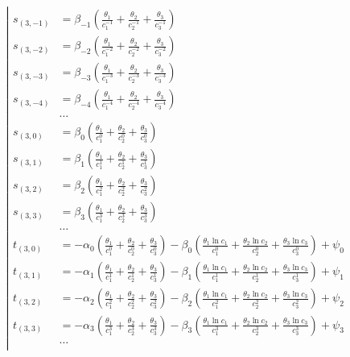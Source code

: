 \begin{equation*} \left| \begin{aligned}
%
s_{(3,-1)} &=
  \beta_{-1} \left(
  \frac{\theta_1}{c_1^{-1}}
+ \frac{\theta_2}{c_2^{-1}}
+ \frac{\theta_3}{c_3^{-1}} \right) \\
%
s_{(3,-2)} &=
  \beta_{-2} \left(
  \frac{\theta_1}{c_1^{-2}}
+ \frac{\theta_2}{c_2^{-2}}
+ \frac{\theta_3}{c_3^{-2}} \right) \\
%
s_{(3,-3)} &=
  \beta_{-3} \left(
  \frac{\theta_1}{c_1^{-3}}
+ \frac{\theta_2}{c_2^{-3}}
+ \frac{\theta_3}{c_3^{-3}} \right) \\
%
s_{(3,-4)} &=
  \beta_{-4} \left(
  \frac{\theta_1}{c_1^{-4}}
+ \frac{\theta_2}{c_2^{-4}}
+ \frac{\theta_3}{c_3^{-4}} \right) \\
%
&\ldots \\
%
s_{(3,0)} &=
  \beta_0 \left(
  \frac{\theta_1}{c_1^0}
+ \frac{\theta_2}{c_2^0}
+ \frac{\theta_3}{c_3^0} \right) \\
%
s_{(3,1)} &=
  \beta_1 \left(
  \frac{\theta_1}{c_1^1}
+ \frac{\theta_2}{c_2^1}
+ \frac{\theta_3}{c_3^1} \right) \\
%
s_{(3,2)} &=
  \beta_2 \left(
  \frac{\theta_1}{c_1^2}
+ \frac{\theta_2}{c_2^2}
+ \frac{\theta_3}{c_3^2} \right) \\
%
s_{(3,3)} &=
  \beta_3 \left(
  \frac{\theta_1}{c_1^3}
+ \frac{\theta_2}{c_2^3}
+ \frac{\theta_3}{c_3^3} \right) \\
%
&\ldots \\
%
t_{(3,0)} &=
- \alpha_0 \left(
  \frac{\theta_1}{c_1^0}
+ \frac{\theta_2}{c_2^0}
+ \frac{\theta_3}{c_3^0} \right)
- \beta_0 \left(
  \frac{\theta_1 \ln{c_1}}{c_1^0}
+ \frac{\theta_2 \ln{c_2}}{c_2^0}
+ \frac{\theta_3 \ln{c_3}}{c_3^0} \right)
+ \psi_0 \\
%
t_{(3,1)} &=
- \alpha_1 \left(
  \frac{\theta_1}{c_1^1}
+ \frac{\theta_2}{c_2^1}
+ \frac{\theta_3}{c_3^1} \right)
- \beta_1 \left(
  \frac{\theta_1 \ln{c_1}}{c_1^1}
+ \frac{\theta_2 \ln{c_2}}{c_2^1}
+ \frac{\theta_3 \ln{c_3}}{c_3^1} \right)
+ \psi_1 \\
%
t_{(3,2)} &=
- \alpha_2 \left(
  \frac{\theta_1}{c_1^2}
+ \frac{\theta_2}{c_2^2}
+ \frac{\theta_3}{c_3^2} \right)
- \beta_2 \left(
  \frac{\theta_1 \ln{c_1}}{c_1^2}
+ \frac{\theta_2 \ln{c_2}}{c_2^2}
+ \frac{\theta_3 \ln{c_3}}{c_3^2} \right)
+ \psi_2 \\
%
t_{(3,3)} &=
- \alpha_3 \left(
  \frac{\theta_1}{c_1^3}
+ \frac{\theta_2}{c_2^3}
+ \frac{\theta_3}{c_3^3} \right)
- \beta_3 \left(
  \frac{\theta_1 \ln{c_1}}{c_1^3}
+ \frac{\theta_2 \ln{c_2}}{c_2^3}
+ \frac{\theta_3 \ln{c_3}}{c_3^3} \right)
+ \psi_3 \\
%
&\ldots \\
\end{aligned} \right. \end{equation*}
